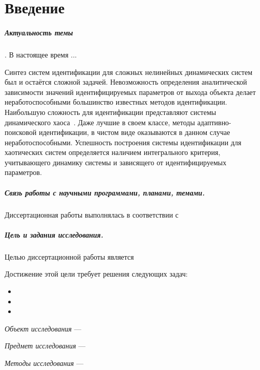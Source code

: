 \chapter*{Введение}

\paragraph{Актуальность темы}.
В настоящее время ...

Синтез систем идентификации для сложных нелинейных динамических систем
был и остаётся сложной задачей. Невозможность определения
аналитической зависимости значений идентифицируемых параметров
от выхода объекта делает неработоспособными большинство известных
методов идентификации. Наибольшую сложность для идентификации
представляют системы динамического хаоса~\cite{moon_chaotic_vibr,anisch_nonlin_eff,sprott_212}.
Даже лучшие в своем классе, методы адаптивно-поисковой идентификации, %
в чистом виде оказываются в данном случае неработоспособными.
Успешность построения системы идентификации для хаотических
систем определяется наличием интегрального критерия,
учитывающего динамику системы и зависящего от идентифицируемых параметров.

\paragraph{Связь работы с научными программами, планами, темами.}
Диссертационная работы выполнялась в соответствии с 

\paragraph{Цель и задания исследования.}
Целью диссертационной работы является

Достижение этой цели требует решения следующих задач:

\begin{itemize}

\item

\item

\item

\end{itemize}

\textit{Объект исследования} --- 

\textit{Предмет исследования} ---

\textit{Методы исследования} ---

